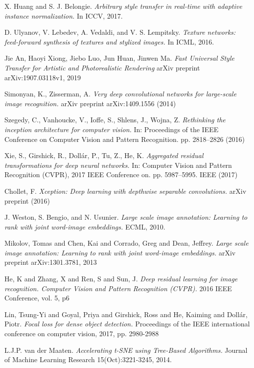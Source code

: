 \documentclass[10pt,twocolumn,letterpaper]{article}
\begin{document}
{\begin{thebibliography}{9}
X. Huang and S. J. Belongie.
\textit{Arbitrary style transfer in real-time with adaptive instance normalization.}
In ICCV, 2017.

D. Ulyanov, V. Lebedev, A. Vedaldi, and V. S. Lempitsky.
\textit{Texture networks: feed-forward synthesis of textures and stylized images.}
In ICML, 2016.

Jie An, Haoyi Xiong, Jiebo Luo, Jun Huan, Jinwen Ma.
\textit{Fast Universal Style Transfer for Artistic and Photorealistic Rendering}
arXiv preprint arXiv:1907.03118v1, 2019

Simonyan, K., Zisserman, A.
\textit{Very deep convolutional networks for large-scale image recognition.}
arXiv preprint arXiv:1409.1556 (2014)

Szegedy, C., Vanhoucke, V., Ioffe, S., Shlens, J., Wojna, Z.
\textit{Rethinking the inception architecture for computer vision.}
In: Proceedings of the IEEE Conference on Computer Vision and Pattern Recognition. pp. 2818–2826 (2016)

Xie, S., Girshick, R., Dollár, P., Tu, Z., He, K.
\textit{Aggregated residual transformations for deep neural networks.}
In: Computer Vision and Pattern Recognition (CVPR), 2017 IEEE Conference on. pp. 5987–5995. IEEE (2017)

Chollet, F.
\textit{Xception: Deep learning with depthwise separable convolutions.}
arXiv preprint (2016)

J. Weston, S. Bengio, and N. Usunier. 
\textit{Large scale image annotation: Learning to rank with joint word-image embeddings.}
ECML, 2010.


Mikolov, Tomas and Chen, Kai and Corrado, Greg and Dean, Jeffrey.
\textit{Large scale image annotation: Learning to rank with joint word-image embeddings.}
arXiv preprint arXiv:1301.3781, 2013


He, K and Zhang, X and Ren, S and Sun, J.
\textit{Deep residual learning for image recognition. Computer Vision and Pattern Recognition (CVPR).}
2016 IEEE Conference, vol. 5, p6 


Lin, Tsung-Yi and Goyal, Priya and Girshick, Ross and He, Kaiming and Doll{\'a}r, Piotr.
\textit{Focal loss for dense object detection.}
Proceedings of the IEEE international conference on computer vision, 2017, pp. 2980-2988

L.J.P. van der Maaten.
\textit{Accelerating t-SNE using Tree-Based Algorithms.}
Journal of Machine Learning Research 15(Oct):3221-3245, 2014.
\end{thebibliography}


}
\end{document}
